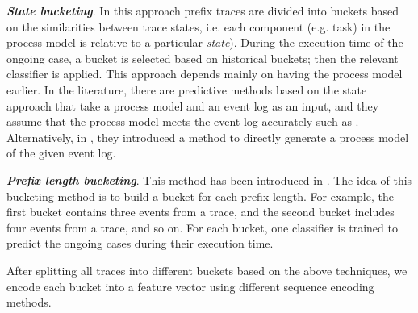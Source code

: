 \textbf{\textit{State bucketing}}. In this approach prefix traces are divided into buckets based on the similarities between trace states, i.e. each component (e.g. task) in the process model is relative to a particular \textit{state}). During the execution time of the ongoing case, a bucket is selected based on historical buckets; then the relevant classifier is applied. This approach depends mainly on having the process model earlier. In the literature, there are predictive methods based on the state approach that take a process model and an event log as an input, and they assume that the process model meets the event log accurately such as \cite{grigori2001improving, conforti2015recommendation, schwegmann2013method}. Alternatively, in \cite{lakshmanan2010predictive}, they introduced a method to directly generate a process model of the given event log. 

\textbf{\textit{Prefix length bucketing}}. This method has been introduced in \cite{leontjeva2016complex, van2012process}. The idea of this bucketing method is to build a bucket for each prefix length. For example, the first bucket contains three events from a trace, and the second bucket includes four events from a trace, and so on. For each bucket, one classifier is trained to predict the ongoing cases during their execution time. 

After splitting all traces into different buckets based on the above techniques, we encode each bucket into a feature vector using different sequence encoding methods. 

